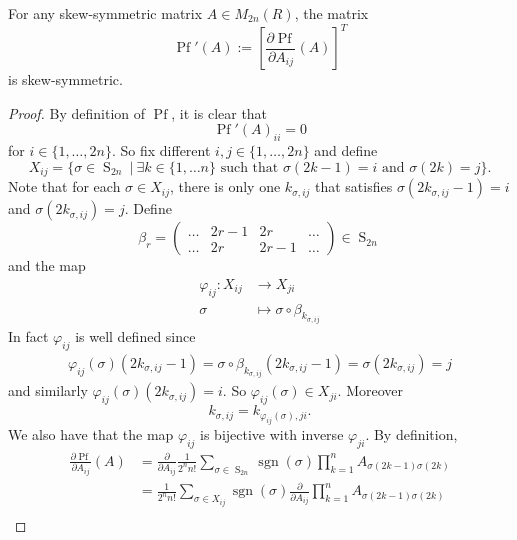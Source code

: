 \documentclass[a4paper,openany]{scrbook}
\begin{document}
\begin{lemma}
    For any skew-symmetric matrix $A\in M_{2n}(R)$, the matrix 
    $$\operatorname{Pf}'(A):=\left[ \frac{\partial \operatorname{Pf}}{\partial A_{ij}}(A) \right]^T$$
    is skew-symmetric.
\end{lemma}

\begin{proof}
    By definition of $\operatorname{Pf}$, it is clear that 
    $$\operatorname{Pf}'(A)_{ii}=0$$
    for $i \in \{1,\dots,2n\}$. So fix different $i,j \in \{1,\dots,2n\}$ and define
    $$X_{ij} = \{\sigma \in \operatorname{S}_{2n} \ | \ \exists k \in\{1,\dots n\} \text{ such that } \sigma(2k-1) = i \text{ and } \sigma(2k)=j \}.$$
    Note that for each $\sigma \in X_{ij}$, there is only one $k_{\sigma,ij}$ that satisfies $\sigma(2k_{\sigma,ij}-1) = i$ and $\sigma(2k_{\sigma,ij})=j$. Define
    $$\beta_r =  \left(\begin{matrix}
    \dots & 2r-1 & 2r & \dots \\
    \dots & 2r & 2r-1 & \dots
    \end{matrix} \right) \in \operatorname{S}_{2n}$$
     and the map 
    \begin{align*}
        \varphi_{ij}:X_{ij} &\rightarrow X_{ji}\\
        \sigma &\mapsto \sigma \circ \beta_{k_{\sigma,ij}}
    \end{align*}
    In fact $\varphi_{ij}$ is well defined since
    \begin{align*}
        \varphi_{ij}(\sigma)(2k_{\sigma,ij}-1) = \sigma \circ \beta_{k_{\sigma,ij}}(2k_{\sigma,ij}-1)=\sigma(2k_{\sigma,ij}) = j
    \end{align*}
    and similarly $\varphi_{ij}(\sigma)(2k_{\sigma,ij}) = i$. So $\varphi_{ij}(\sigma) \in X_{ji}$. Moreover
    \begin{equation}
        \label{rosetta}
        k_{\sigma,ij} = k_{\varphi_{ij}(\sigma),ji}.
    \end{equation}
    We also have that the map $\varphi_{ij}$ is bijective with inverse $\varphi_{ji}$. By definition,
    \begin{align*}
        \frac{\partial\operatorname{Pf}}{\partial A_{ij}}(A) &= \frac{\partial}{\partial A_{ij}} \frac{1}{2^n n!} \sum_{\sigma \in \operatorname{S}_{2n}} \operatorname{sgn}(\sigma) \prod_{k=1}^n A_{\sigma(2k-1) \sigma(2k)} \\
        &= \frac{1}{2^n n!} \sum_{\sigma \in X_{ij}} \operatorname{sgn}(\sigma) \frac{\partial}{\partial A_{ij}} \prod_{k=1}^n A_{\sigma(2k-1) \sigma(2k)} \\

\end{align*}
\end{proof}
\end{document}
